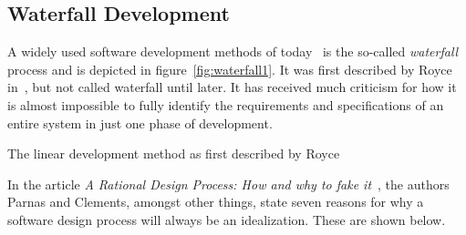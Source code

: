 \documentclass[a4paper]{report}
\begin{document}
\subsection{Waterfall Development} \label{sec:waterfall-development}
A widely used software development methods of today~\cite{Petersen-et-al:2009} is the so-called \emph{waterfall} process and is depicted in figure~\ref{fig:waterfall1}. It was first described by Royce in~\cite{Royce:1987}, but not called waterfall until later. It has received much criticism for how it is almost impossible to fully identify the requirements and specifications of an entire system in just one phase of development.

	{The linear development method as first described by Royce~\cite{Royce:1987}}

In the article \emph{A Rational Design Process: How and why to fake it}~\cite{Parnas-Clements:1985}, the authors Parnas and Clements, amongst other things, state seven reasons for why a software design process will always be an idealization. These are shown below.
\end{document}

